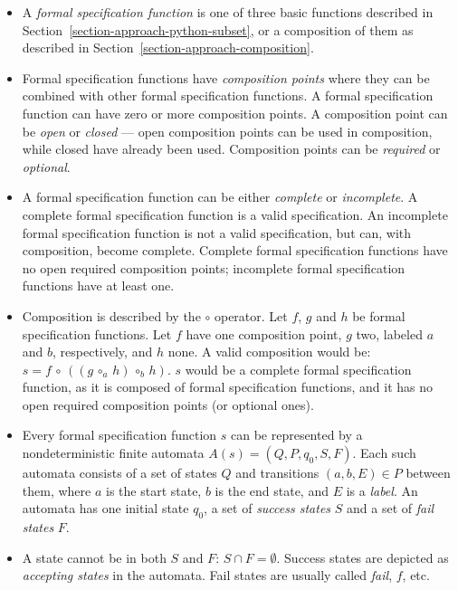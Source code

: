 \documentclass[a4paper,11pt]{kth-mag}
\begin{document}
\begin{itemize}
  \item A \textit{formal specification function} is one of three basic
    functions described in Section~\ref{section-approach-python-subset}, or a
    composition of them as described in
    Section~\ref{section-approach-composition}.

  \item Formal specification functions have \textit{composition points} where
    they can be combined with other formal specification functions. A formal
    specification function can have zero or more composition points. A
    composition point can be \textit{open} or \textit{closed} --- open
    composition points can be used in composition, while closed have already
    been used. Composition points can be \textit{required} or
    \textit{optional}.

  \item A formal specification function can be either \textit{complete} or
    \textit{incomplete}. A complete formal specification function is a valid
    specification. An incomplete formal specification function is not a valid
    specification, but can, with composition, become complete. Complete formal
    specification functions have no open required composition points;
    incomplete formal specification functions have at least one.

  \item Composition is described by the $\circ$ operator. Let $f$, $g$ and $h$
    be formal specification functions. Let $f$ have one composition point, $g$
    two, labeled $a$ and $b$, respectively, and $h$ none. A valid composition
    would be: $s = f \, \circ \, ((g \, \circ_{a} \, h) \, \circ_{b} \, h)$.
    $s$ would be a complete formal specification function, as it is composed of
    formal specification functions, and it has no open required composition
    points (or optional ones).

  \item Every formal specification function $s$ can be represented by a
    nondeterministic finite automata $A(s) = (Q, P, q_0, S, F)$. Each such
    automata consists of a set of states $Q$ and transitions $(a, b, E) \in P$
    between them, where $a$ is the start state, $b$ is the end state, and $E$
    is a \textit{label}. An automata has one initial state $q_0$, a set of
    \textit{success states} $S$ and a set of \textit{fail states} $F$.

  \item A state cannot be in both $S$ and $F$: $S \cap F = \emptyset$. Success
    states are depicted as \textit{accepting states} in the automata. Fail
    states are usually called \textit{fail}, $f$, etc.


\end{itemize}
\end{document}
